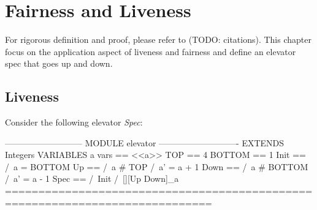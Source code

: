 \documentclass{report}
\begin{document}
\chapter{Fairness and Liveness}

For rigorous definition and proof, please refer to (TODO: citations). This
chapter focus on the application aspect of liveness and fairness and define an elevator 
spec that goes up and down.\newline


\section{Liveness}

Consider the following elevator \textit{Spec}:
\begin{tla}
--------------------------- MODULE elevator ----------------------------
EXTENDS Integers
VARIABLES a
vars == <<a>>
TOP     == 4
BOTTOM  == 1
Init ==
    /\ a = BOTTOM
Up == 
    /\ a # TOP
    /\ a' = a + 1
Down == 
    /\ a # BOTTOM
    /\ a' = a - 1
Spec ==
  /\ Init
  /\ [][Up \/ Down]_a
=============================================================================
\end{tla}
\begin{tlatex}
\@x{}\moduleLeftDash{}\moduleRightDash\@xx{}%
%
%
%
%
%
%
%
%
%
%
%
%
%
%
%
%
\@x{}\bottombar\@xx{}%
\end{tlatex}
\end{document}
